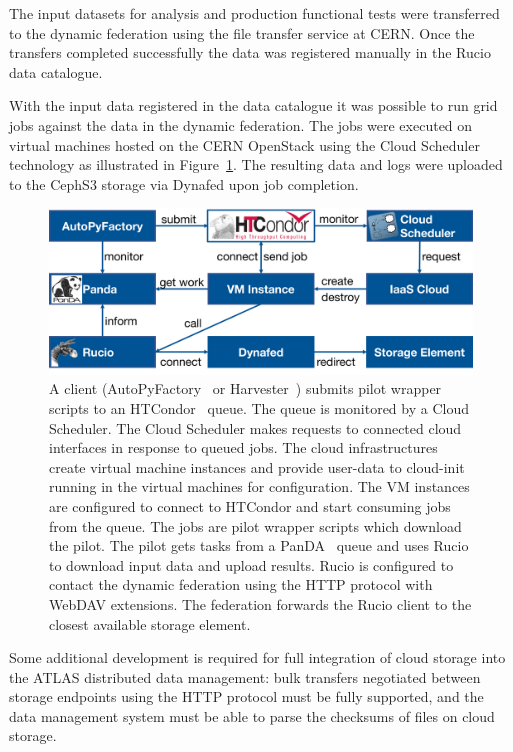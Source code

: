 \documentclass[a4paper]{jpconf}
\begin{document}
The input datasets for analysis and production functional tests were transferred to the dynamic federation using the file transfer service at CERN. Once the transfers completed successfully the data was registered manually in the Rucio data catalogue.

With the input data registered in the data catalogue it was possible to run grid jobs against the data in the dynamic federation. The jobs were executed on virtual machines hosted on the CERN OpenStack using the Cloud Scheduler technology as illustrated in Figure~\ref{fig:atlas-cloud}. The resulting data and logs were uploaded to the CephS3 storage via Dynafed upon job completion.

\begin{figure}
  \includegraphics[width=\textwidth]{atlas-cloud-system.png}
  \caption{A client (AutoPyFactory~\cite{apf} or Harvester~\cite{harvester}) submits pilot wrapper scripts to an HTCondor~\cite{htcondor} queue. The queue is monitored by a Cloud Scheduler. The Cloud Scheduler makes requests to connected cloud interfaces in response to queued jobs. The cloud infrastructures create virtual machine instances and provide user-data to cloud-init running in the virtual machines for configuration. The VM instances are configured to connect to HTCondor and start consuming jobs from the queue. The jobs are pilot wrapper scripts which download the pilot. The pilot gets tasks from a PanDA~\cite{panda} queue and uses Rucio to download input data and upload results. Rucio is configured to contact the dynamic federation using the HTTP protocol with WebDAV extensions. The federation forwards the Rucio client to the closest available storage element.}
  \label{fig:atlas-cloud}
\end{figure}

Some additional development is required for full integration of cloud storage into the ATLAS distributed data management: bulk transfers negotiated between storage endpoints using the HTTP protocol must be fully supported, and the data management system must be able to parse the checksums of files on cloud storage.
\end{document}
